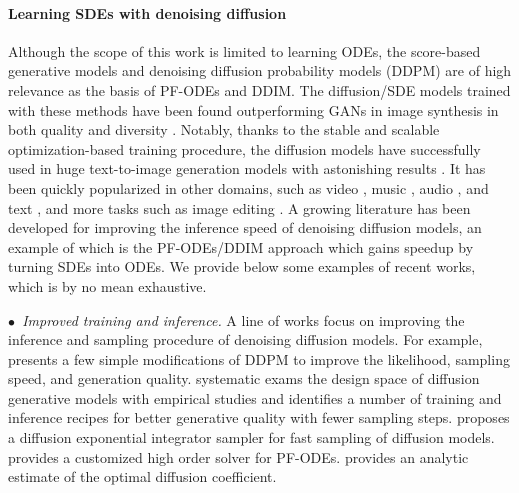 \documentclass[11pt]{article}
\begin{document}
\paragraph{Learning SDEs with denoising diffusion} 
Although the scope of this work 
is limited to learning ODEs, the  score-based generative models \citep{song2019generative, song2020improved, song2020score, song2021maximum}
and denoising diffusion probability models (DDPM) \citep{ho2020denoising} 
are of high relevance 
as the basis of PF-ODEs and DDIM. 
The diffusion/SDE models trained with these methods have been found outperforming GANs in image synthesis 
in both quality and diversity \cite{dhariwal2021diffusion}. 
Notably,  
thanks to the stable and scalable optimization-based training procedure, 
the diffusion models have successfully used in  huge text-to-image  generation models with astonishing results 
\citep[e.g.,][]{glide, dalle2, imagegen}.  
It has been quickly popularized in other domains, such as
video \citep[e.g.,][]{ho2022video, yang2022diffusion, harvey2022flexible}, 
music \citep{mittal2021symbolic}, audio \citep[e.g.,][]{kong2020diffwave, lee2021nu, popov2021grad}, and text \citep{li2022diffusion, wang2022language}, 
and more tasks such as image editing  \citep{zhao2022egsde, meng2021sdedit}. 
A growing literature has been developed for improving the inference speed of denoising diffusion models, 
an example of which is 
the PF-ODEs/DDIM approach which gains speedup by turning SDEs into ODEs. 
We provide  below some examples of recent works,
which is by no mean  exhaustive. 

\emph{$\bullet$~Improved training and inference.} 
A line of works focus on  improving the inference and sampling procedure of denoising diffusion models. 
For example, 
\cite{nichol2021improved} presents 
a few simple modifications of DDPM to improve the likelihood, sampling speed, and generation quality. 
\cite{elucidating}  systematic exams  the design space of diffusion generative models 
with empirical studies and identifies a number of training and inference recipes 
for better generative quality with fewer sampling steps. 
\cite{zhang2022fast} proposes a diffusion exponential integrator sampler for fast sampling of diffusion models. \cite{lu2022dpm} provides a customized high order solver for PF-ODEs. 
\citep{bao2022analytic} provides an analytic estimate of the optimal diffusion coefficient. 
\end{document}

